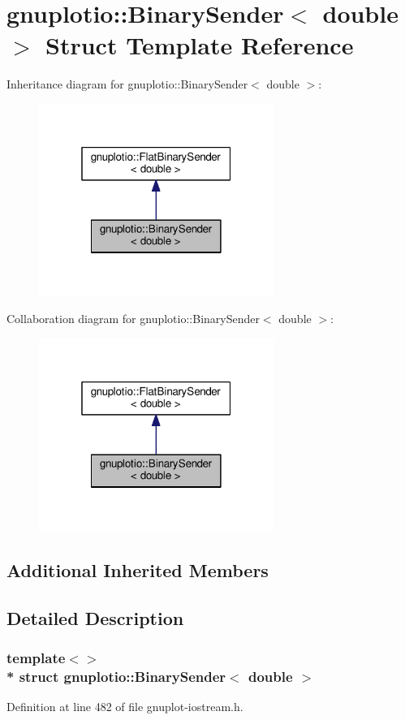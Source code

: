 \hypertarget{structgnuplotio_1_1_binary_sender_3_01double_01_4}{}\section{gnuplotio\+:\+:Binary\+Sender$<$ double $>$ Struct Template Reference}
\label{structgnuplotio_1_1_binary_sender_3_01double_01_4}


Inheritance diagram for gnuplotio\+:\+:Binary\+Sender$<$ double $>$\+:
\nopagebreak
\begin{figure}[H]
\begin{center}
\leavevmode
\includegraphics[width=217pt]{structgnuplotio_1_1_binary_sender_3_01double_01_4__inherit__graph}
\end{center}
\end{figure}


Collaboration diagram for gnuplotio\+:\+:Binary\+Sender$<$ double $>$\+:
\nopagebreak
\begin{figure}[H]
\begin{center}
\leavevmode
\includegraphics[width=217pt]{structgnuplotio_1_1_binary_sender_3_01double_01_4__coll__graph}
\end{center}
\end{figure}
\subsection*{Additional Inherited Members}


\subsection{Detailed Description}
\subsubsection*{template$<$$>$\\*
struct gnuplotio\+::\+Binary\+Sender$<$ double $>$}



Definition at line 482 of file gnuplot-\/iostream.\+h.

